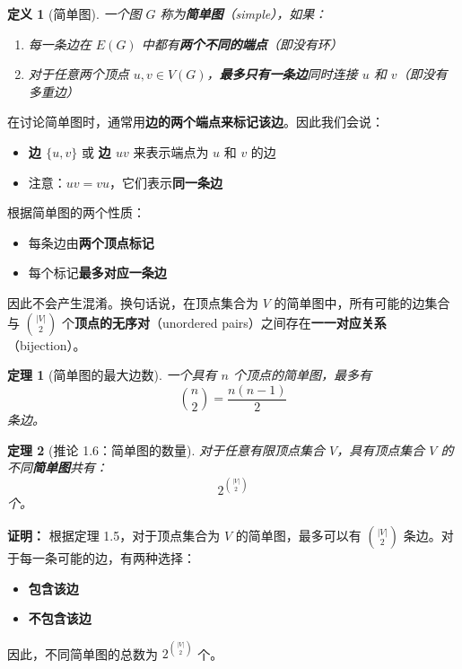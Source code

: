 \documentclass[12pt, a4paper]{article}
\newtheorem{definition}{定义}[section]
\newtheorem{theorem}{定理}[section]
\begin{document}
\begin{definition}[简单图]
一个图 $G$ 称为\textbf{简单图}（simple），如果：
\begin{enumerate}
    \item 每一条边在 $E(G)$ 中都有\textbf{两个不同的端点}（即没有环）
    \item 对于任意两个顶点 $u, v \in V(G)$，\textbf{最多只有一条边}同时连接 $u$ 和 $v$（即没有多重边）
\end{enumerate}
\end{definition}

在讨论简单图时，通常用\textbf{边的两个端点来标记该边}。因此我们会说：
\begin{itemize}
    \item \textbf{边 $\{u, v\}$} 或 \textbf{边 $uv$} 来表示端点为 $u$ 和 $v$ 的边
    \item 注意：$uv = vu$，它们表示\textbf{同一条边}
\end{itemize}

根据简单图的两个性质：
\begin{itemize}
    \item 每条边由\textbf{两个顶点标记}
    \item 每个标记\textbf{最多对应一条边}
\end{itemize}

因此不会产生混淆。换句话说，在顶点集合为 $V$ 的简单图中，所有可能的边集合与 $\binom{|V|}{2}$ 个\textbf{顶点的无序对}（unordered pairs）之间存在\textbf{一一对应关系}（bijection）。

\begin{theorem}[简单图的最大边数]
一个具有 $n$ 个顶点的简单图，最多有
\[
\binom{n}{2} = \frac{n(n-1)}{2}
\]
条边。
\end{theorem}

\begin{theorem}[推论 1.6：简单图的数量]
对于任意有限顶点集合 $V$，具有顶点集合 $V$ 的不同\textbf{简单图}共有：
\[
2^{\binom{|V|}{2}}
\]
个。
\end{theorem}

\textbf{证明：} 根据定理 1.5，对于顶点集合为 $V$ 的简单图，最多可以有 $\binom{|V|}{2}$ 条边。对于每一条可能的边，有两种选择：
\begin{itemize}
    \item \textbf{包含该边}
    \item \textbf{不包含该边}
\end{itemize}
因此，不同简单图的总数为 $2^{\binom{|V|}{2}}$ 个。

\end{document}
